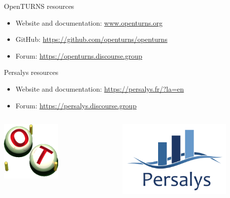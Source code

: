 \documentclass{beamer}
\begin{document}
\begin{frame}

\begin{block}{OpenTURNS resources}
\begin{itemize}
    \item Website and documentation: \url{www.openturns.org}
    \item GitHub: \url{https://github.com/openturns/openturns}
    \item Forum: \url{https://openturns.discourse.group}
\end{itemize}    
\end{block}

\begin{block}{Persalys resources}
\begin{itemize}
    \item Website and documentation: \url{https://persalys.fr/?la=en}
    \item Forum: \url{https://persalys.discourse.group}
\end{itemize}    
\end{block}

\begin{columns}
\centering
\includegraphics[width=0.5\textwidth]{figures/logo-openturns.png}

\includegraphics[width=0.8\textwidth]{figures/PERSALYS-LOGO.png}

\end{columns}

\end{frame}
  
\end{document}
